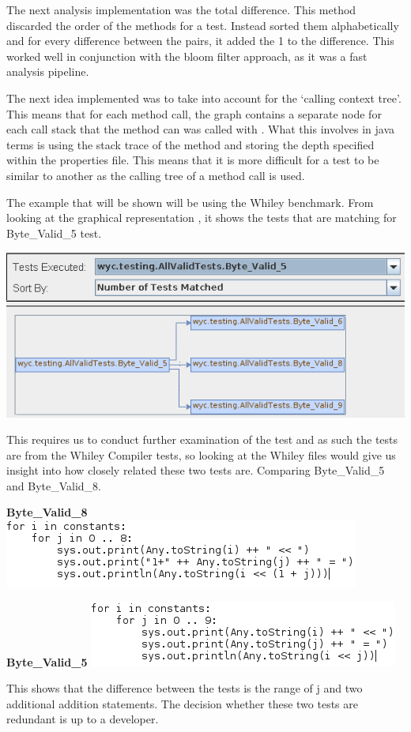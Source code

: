 The next analysis implementation was the total difference. This method discarded the order of the methods for a test. Instead sorted them alphabetically and for every difference between the pairs, it added the 1 to the difference. This worked well in conjunction with the bloom filter approach, as it was a fast analysis pipeline. 

The next idea implemented was to take into account for the ‘calling context tree’. This means that for each method call, the graph contains a separate node for each call stack that the method can was called with  . What this involves in java terms is using the stack trace of the method and storing the depth specified within the properties file. This means that it is more difficult for a test to be similar to another as the calling tree of a method call is used.

The example that will be shown will be using the Whiley benchmark. From looking at the graphical representation , it shows the tests that are matching for Byte\_Valid\_5 test.

\includegraphics[width=\textwidth]{model24.png}

This requires us to conduct further examination of the test and as such the tests are from the Whiley Compiler tests, so looking at the Whiley files would give us insight into how closely related these two tests are. Comparing Byte\_Valid\_5 and Byte\_Valid\_8.

\textbf{Byte\_Valid\_8} 
\includegraphics[]{model25.png}

\textbf{Byte\_Valid\_5}
\includegraphics[]{model26.png}

This shows that the difference between the tests is the range of j and two additional addition statements. The decision whether these two tests are redundant is up to a developer. 


